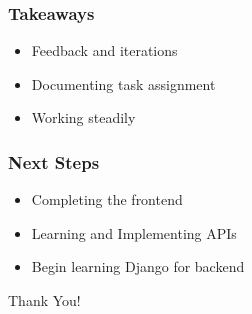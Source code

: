\documentclass{beamer}
\begin{document}
\begin{frame}
\frametitle{Takeaways}
\begin{itemize}
  \item Feedback and iterations
  \item Documenting task assignment
  \item Working steadily
\end{itemize}
\end{frame}

\begin{frame}
\frametitle{Next Steps}
\begin{itemize}
  \item Completing the frontend
  \item Learning and Implementing APIs
  \item Begin learning Django for backend
\end{itemize}
\end{frame}

\begin{frame}
  \center\Huge Thank You!
\end{frame}
\end{document}

